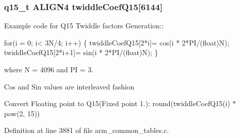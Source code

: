 \hypertarget{group___c_f_f_t___c_i_f_f_t_ga39e78f61a5f4bd5cfb577b11099a2c7f}{
\subsubsection[{twiddle\-Coef\-Q15}]{ {\bf q15\-\_\-t} A\-L\-I\-G\-N4 twiddle\-Coef\-Q15\mbox{[}6144\mbox{]}}}\label{group___c_f_f_t___c_i_f_f_t_ga39e78f61a5f4bd5cfb577b11099a2c7f}
\begin{DoxyParagraph}{}
Example code for Q15 Twiddle factors Generation\-:\-: 
\end{DoxyParagraph}
\begin{DoxyParagraph}{}

\begin{DoxyPre}for(i = 0; i< 3N/4; i++)    
\{    
      twiddleCoefQ15[2*i]= cos(i * 2*PI/(float)N);    
      twiddleCoefQ15[2*i+1]= sin(i * 2*PI/(float)N);    
\} \end{DoxyPre}
 
\end{DoxyParagraph}
\begin{DoxyParagraph}{}
where N = 4096 and P\-I = 3. 
\end{DoxyParagraph}
\begin{DoxyParagraph}{}
Cos and Sin values are interleaved fashion 
\end{DoxyParagraph}
\begin{DoxyParagraph}{}
Convert Floating point to Q15(Fixed point 1.)\-: round(twiddle\-Coef\-Q15(i) $\ast$ pow(2, 15)) 
\end{DoxyParagraph}


Definition at line 3881 of file arm\-\_\-common\-\_\-tables.\-c.

